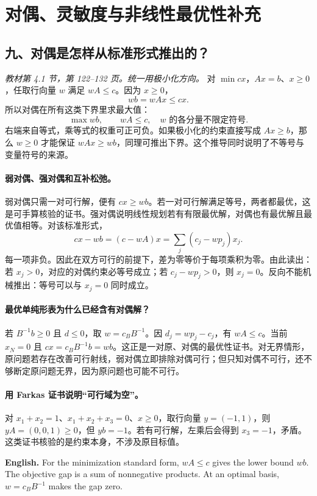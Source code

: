 \documentclass[UTF8,11pt,a4paper]{ctexart}
\newcommand{\EN}[1]{\par\noindent \textbf{English.} #1\par}
\begin{document}
\clearpage
\section*{对偶、灵敏度与非线性最优性补充}
\label{opt:theory}
\subsection*{九、对偶是怎样从标准形式推出的？}
\noindent\textit{教材第 4.1 节，第 122--132 页。统一用极小化方向。}
对 $\min cx$，$Ax=b$、$x\ge0$，任取行向量 $w$ 满足 $wA\le c$。因为 $x\ge0$，
\[
 wb=wAx\le cx.
\]
所以对偶在所有这类下界里求最大值：
\[
 \max wb,\qquad wA\le c,\quad w\text{ 的各分量不限定符号}.
\]
右端来自等式，乘等式的权重可正可负。如果极小化的约束直接写成 $Ax\ge b$，那么 $w\ge0$ 才能保证 $wAx\ge wb$，同理可推出下界。这个推导同时说明了不等号与变量符号的来源。

\paragraph{弱对偶、强对偶和互补松弛。}
弱对偶只需一对可行解，便有 $cx\ge wb$。若一对可行解满足等号，两者都最优，这是可手算核验的证书。强对偶说明线性规划若有有限最优解，对偶也有最优解且最优值相等。对该标准形式，
\[
 cx-wb=(c-wA)x=\sum_j(c_j-wp_j)x_j .
\]
每一项非负。因此在双方可行的前提下，差为零等价于每项乘积为零。由此读出：若 $x_j>0$，对应的对偶约束必等号成立；若 $c_j-wp_j>0$，则 $x_j=0$。反向不能机械推出：等号可以与 $x_j=0$ 同时成立。

\paragraph{最优单纯形表为什么已经含有对偶解？}
若 $B^{-1}b\ge0$ 且 $d\le0$，取 $w=c_BB^{-1}$。因 $d_j=wp_j-c_j$，有 $wA\le c$。当前 $x_N=0$ 且 $cx=c_BB^{-1}b=wb$。这正是一对原、对偶的最优性证书。对无界情形，原问题若存在改善可行射线，弱对偶立即排除对偶可行；但只知对偶不可行，还不够断定原问题无界，因为原问题也可能不可行。

\paragraph{用 Farkas 证书说明“可行域为空”。}
对 $x_1+x_2=1$、$x_1+x_2+x_3=0$、$x\ge0$，取行向量 $y=(-1,1)$，则 $yA=(0,0,1)\ge0$，但 $yb=-1$。若有可行解，左乘后会得到 $x_3=-1$，矛盾。这类证书核验的是约束本身，不涉及原目标值。
\EN{For the minimization standard form, $wA\le c$ gives the lower bound $wb$. The objective gap is a sum of nonnegative products. At an optimal basis, $w=c_BB^{-1}$ makes the gap zero.}
\end{document}
